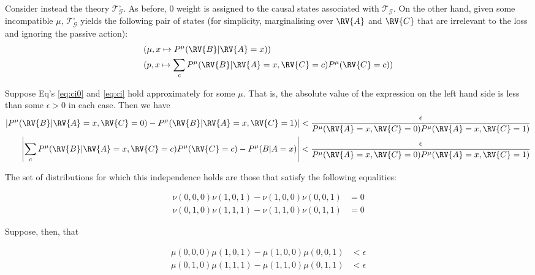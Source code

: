 Consider instead the theory $\mathscr{T}^\square_{\mathcal{G}}$. As before, 0 weight is assigned to the causal states associated with $\mathscr{T}_{\mathcal{G}}$. On the other hand, given some incompatible $\mu$, $\mathscr{T}^\square_{\mathcal{G}}$ yields the following pair of states (for simplicity, marginalising over $\RV{A}$ and $\RV{C}$ that are irrelevant to the loss and ignoring the passive action):
\begin{align}
    &(\mu,x\mapsto P^\mu(\RV{B}|\RV{A}=x) )\label{eq:cbn_s1}\\
    &(p,x \mapsto \sum_c P^\mu(\RV{B}|\RV{A}=x,\RV{C}=c)P^\mu(\RV{C}=c)) \label{eq:cbn_s2}
\end{align}

Suppose Eq's \ref{eq:ci0} and \ref{eq:ci} hold approximately for some $\mu$. That is, the absolute value of the expression on the left hand side is less than some $\epsilon>0$ in each case. Then we have
\begin{align}
    \left|P^\mu(\RV{B}|\RV{A}=x,\RV{C}=0) - P^\mu(\RV{B}|\RV{A}=x,\RV{C}=1) \right| &< \frac{\epsilon}{P^\mu(\RV{A}=x,\RV{C}=0) P^\mu(\RV{A}=x,\RV{C}=1)}\\
    \left|\sum_c P^\mu(\RV{B}|\RV{A}=x,\RV{C}=c)P^\mu(\RV{C}=c)-P^\mu(B|A=x)\right| &< \frac{\epsilon}{P^\mu(\RV{A}=x,\RV{C}=0) P^\mu(\RV{A}=x,\RV{C}=1)} 
\end{align}

The set of distributions for which this independence holds are those that satisfy the following equalities:

\begin{align}
    \nu(0,0,0)\nu(1,0,1)-\nu(1,0,0)\nu(0,0,1)&=0\label{eq:ci0}\\
    \nu(0,1,0)\nu(1,1,1)-\nu(1,1,0)\nu(0,1,1)&=0 \label{eq:ci}
\end{align}

Suppose, then, that 

\begin{align}
    \mu(0,0,0)\mu(1,0,1)-\mu(1,0,0)\mu(0,0,1)&<\epsilon\label{eq:eci0}\\
    \mu(0,1,0)\mu(1,1,1)-\mu(1,1,0)\mu(0,1,1)&<\epsilon \label{eq:eci1}
\end{align}